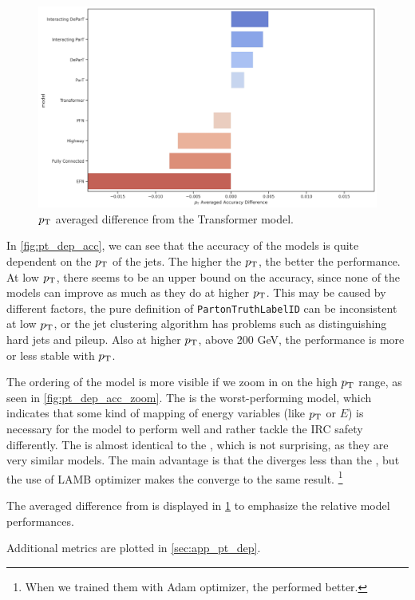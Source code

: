 \begin{figure}[htb]
    \centering
    \includegraphics[width=1\linewidth]{src/plots/results/pT_dep/relative_error.jpg}
    \caption{$p_\text{T}$ averaged difference from the Transformer model.}
    \label{fig:pt_dep_diff}
\end{figure}
In \cref{fig:pt_dep_acc}, we can see that the accuracy of the models is quite dependent on the $p_\text{T}$ of the jets.
The higher the $p_\text{T}$, the better the performance.
At low $p_\text{T}$, there seems to be an upper bound on the accuracy, since none of the models can improve as much as they do at higher $p_\text{T}$.
This may be caused by different factors, the pure definition of \texttt{PartonTruthLabelID} can be inconsistent at low $p_\text{T}$, or the jet clustering algorithm has problems such as distinguishing hard jets and pileup.
Also at higher $p_\text{T}$, above 200 GeV, the performance is more or less stable with $p_\text{T}$.

The ordering of the model is more visible if we zoom in on the high $p_\text{T}$ range, as seen in \cref{fig:pt_dep_acc_zoom}.
The \EFN is the worst-performing model, which indicates that some kind of mapping of energy variables (like $p_\text{T}$ or $E$) is necessary for the model to perform well and rather tackle the IRC safety differently.
The \highway is almost identical to the \fc, which is not surprising, as they are very similar models.
The main advantage is that the \highway diverges less than the \fc, but the use of LAMB optimizer makes the \fc converge to the same result. \footnote{When we trained them with Adam optimizer, the \highway performed better.}

The averaged difference from \trans is displayed in \cref{fig:pt_dep_diff} to emphasize the relative model performances. 

Additional metrics are plotted in \cref{sec:app_pt_dep}.

